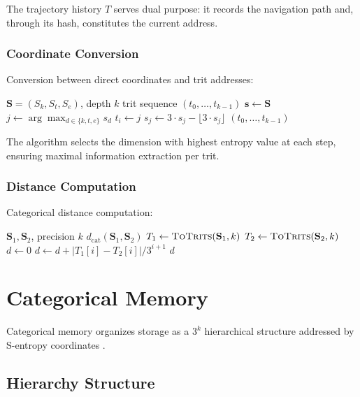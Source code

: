 \documentclass[10pt,twocolumn]{article}
\theoremstyle{definition}
\theoremstyle{remark}
\newcommand{\Sk}{S_k}
\newcommand{\St}{S_t}
\newcommand{\Se}{S_e}
\newcommand{\Scoord}{\mathbf{S}}
\begin{document}
The trajectory history $T$ serves dual purpose: it records the navigation path and, through its hash, constitutes the current address.

\subsubsection{Coordinate Conversion}

Conversion between direct coordinates and trit addresses:

\begin{algorithmic}[1]
\REQUIRE $\Scoord = (\Sk, \St, \Se)$, depth $k$
\ENSURE trit sequence $(t_0, \ldots, t_{k-1})$
\STATE $\mathbf{s} \gets \Scoord$
    \STATE $j \gets \arg\max_{d \in \{k,t,e\}} s_d$
    \STATE $t_i \gets j$
    \STATE $s_j \gets 3 \cdot s_j - \lfloor 3 \cdot s_j \rfloor$
\ENDFOR
\RETURN $(t_0, \ldots, t_{k-1})$
\end{algorithmic}

The algorithm selects the dimension with highest entropy value at each step, ensuring maximal information extraction per trit.

\subsubsection{Distance Computation}

Categorical distance computation:

\begin{algorithmic}[1]
\REQUIRE $\Scoord_1, \Scoord_2$, precision $k$
\ENSURE $d_{\text{cat}}(\Scoord_1, \Scoord_2)$
\STATE $T_1 \gets \textsc{ToTrits}(\Scoord_1, k)$
\STATE $T_2 \gets \textsc{ToTrits}(\Scoord_2, k)$
\STATE $d \gets 0$
    \STATE $d \gets d + |T_1[i] - T_2[i]| / 3^{i+1}$
\ENDFOR
\RETURN $d$
\end{algorithmic}

\section{Categorical Memory}
\label{sec:memory}

Categorical memory organizes storage as a $3^k$ hierarchical structure addressed by S-entropy coordinates \cite{hennessy2017,denning1968}.

\subsection{Hierarchy Structure}
\end{document}
